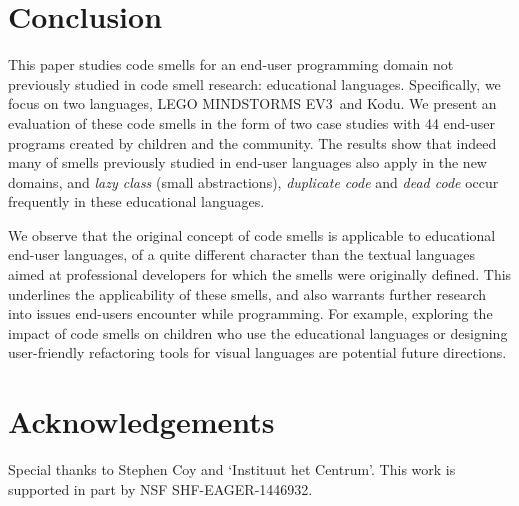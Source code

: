 \documentclass[conference]{IEEEtran}
\newcommand{\ms}{LEGO MINDSTORMS EV3}
\begin{document}
\section{Conclusion}
\label{sec:conclusions}
This paper studies code smells for an end-user programming domain not previously studied in code smell research: educational languages. Specifically, we focus on two languages, \ms~and Kodu. We present an evaluation of these code smells in the form of two case studies with 44 end-user programs created by children and the community. The results show that indeed many of smells previously studied in end-user languages also apply in the new domains, and \emph{lazy class} (small abstractions), \emph{duplicate code} and \emph{dead code} occur frequently in these educational languages. 
%

We observe that the original concept of code smells is applicable to educational end-user languages, of a quite different character than the textual languages aimed at professional developers for which the smells were originally defined. This underlines the applicability of these smells, and also warrants further research into issues end-users encounter while programming. For example, exploring the impact of code smells on children who use the educational languages or designing user-friendly refactoring tools for visual languages are potential future directions. 

\balance

\section*{Acknowledgements}
Special thanks to Stephen Coy and `Instituut het Centrum'. This work is supported in part by  NSF SHF-EAGER-1446932.




\end{document}
